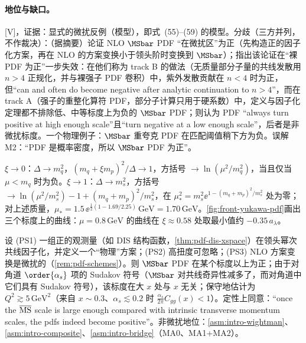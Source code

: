 \paragraph{地位与缺口。}[V]，证据：显式的微扰反例（模型），即\cite{CollinsRogersSato2022}式~(55)--(59) 的模型。分歧（三方并列，不作裁决）：\cite{CandidoForteHekhorn2020}（据摘要）论证 NLO $\MSbar$ PDF “在微扰区”为正（先构造正的因子化方案，再在 NLO 的方案变换小于领头阶时变换到 $\MSbar$）；\cite{CollinsRogersSato2022}指出该论证在“裸 PDF 为正”一步失效：在他们称为 track B 的做法（无质量部分子量的共线发散用 $n>4$ 正规化，并与裸强子 PDF 卷积）中，紫外发散贡献在 $n<4$ 时为正，但“can and often do become negative after analytic continuation to $n>4$”，而在 track A（强子的重整化算符 PDF，部分子计算只用于硬系数）中，定义与因子化定理都不排除低、中等标度上为负的 $\MSbar$ PDF；\cite[第~3--4~节]{Candido:2023ujx}则认为 PDF “always turn positive at high enough scale”且“turn negative at a low enough scale”，后者是非微扰标度。一个物理例子：$\MSbar$ 重夸克 PDF 在匹配阈值稍下方为负\cite[第~I~节]{CollinsRogersSato2022}。误解 M2：“PDF 是概率密度，所以 $\MSbar$ PDF 为正”。


\begin{example}\label{ex:front-yukawa}
$\xi\to0$：$\Delta\to m_q^2$，$(m_q+\xi m_p)^2/\Delta\to1$，方括号 $\to\ln(\mu^2/m_q^2)$，当且仅当 $\mu<m_q$ 时为负。$\xi\to1$：$\Delta\to m_s^2$，方括号 $\to\ln(\mu^2/m_s^2)-1+(m_q+m_p)^2/m_s^2$，在 $\mu_*^2=m_s^2\ee^{1-(m_q+m_p)^2/m_s^2}$ 处为零；对上述质量，$\mu_*=1.5\,\ee^{\frac12(1-1.69/2.25)}\,\mathrm{GeV}=1.70\,\mathrm{GeV}$。\cref{fig:front-yukawa-pdf}画出三个标度上的曲线：$\mu=0.8\,\mathrm{GeV}$ 的曲线在 $\xi\approx0.58$ 处取最小值约 $-0.35\,a_\lambda$。
\end{example}

\begin{proposition}\label{prop:front-positivity-large-scale}
设 (PS1) 一组正的观测量（如 DIS 结构函数，\cref{thm:pdf-dis-xspace}）在领头幂次共线因子化，并定义一个“物理”方案；(PS2) 高扭度可忽略；(PS3) NLO 方案变换是微扰的（\cref{rem:pdf-schemes}）。则 $\MSbar$ PDF 在某个标度以上为正；由于对角道 $\order{\alpha_s}$ 项的 Sudakov 符号（$\MSbar$ 对共线奇异性减多了，而对角道中它们具有 Sudakov 符号），该标度在大 $x$ 处与 $x$ 无关；\cite{Candido:2023ujx}保守地估计为 $Q^2\gtrsim5\,\mathrm{GeV}^2$（来自 $x\sim0.3$、$\alpha_s\lesssim0.2$ 时 $\frac{\alpha_s}{2\pi}C_{gg}(x)<1$）。\cite{CollinsRogersSato2022}定性上同意：“once the $\overline{\rm MS}$ scale is large enough compared with intrinsic transverse momentum scales, the pdfs indeed become positive”。非微扰地位：\cref{asm:intro-wightman}、\cref{asm:intro-composite}、\cref{asm:intro-bridge}（MA0、MA1+MA2）。
\end{proposition}

